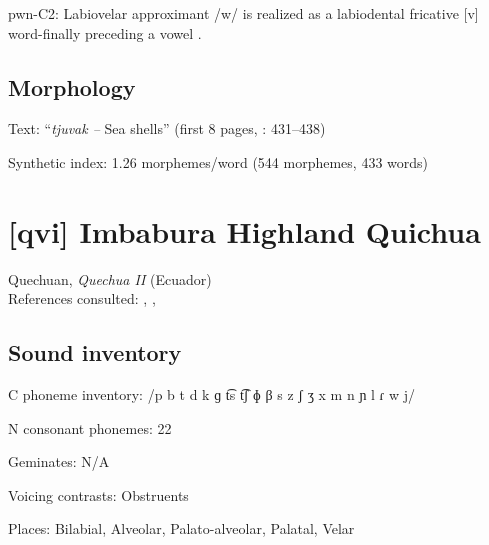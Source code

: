 {\begin{appendixdesc}
\item[pwn-C2:] Labiovelar approximant /w/ is realized as a labiodental fricative [v] word-finally preceding a vowel \citep[40]{Chang2006}.
\end{appendixdesc}
\subsection*{Morphology}

\begin{appendixdesc}

\item[Text:] “\textit{tjuvak --} Sea shells” (first 8 pages, \citealt{Chang2006}: 431--438)

\item[Synthetic index:] 1.26 morphemes/word (544 morphemes, 433 words)
\end{appendixdesc}
\section*{[qvi] Imbabura Highland Quichua}  %
Quechuan, \textit{Quechua II} (Ecuador)\medskip\\
References consulted: \citet{Carpenter1982}, \citet{Cole1982}, \citet{Jake1983}

\subsection*{Sound inventory}
\begin{appendixdesc}

\item[C phoneme inventory:] /p b t d k ɡ t͡s t͡ʃ ɸ β s z ʃ ʒ x m n ɲ l ɾ w j/

\item[N consonant phonemes:] 22

\item[Geminates:] N/A

\item[Voicing contrasts:] Obstruents

\item[Places:] Bilabial, Alveolar, Palato-alveolar, Palatal, Velar


\end{appendixdesc}}
